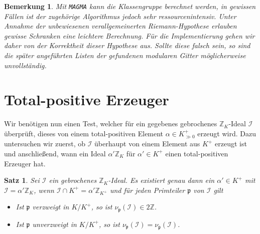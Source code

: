 \documentclass[12pt,a4paper,halfparskip,headsepline,bibtotocnumbered]{scrreprt}
\theoremstyle{nummermitklammern}
\newtheorem{satz}[defsatzusw]{Satz}
\newtheorem{bemerkung}[defsatzusw]{Bemerkung}
\theoremstyle{nonumberbreak}
\newcommand{\Z}{\mathbb{Z}}
\newcommand{\I}{\mathcal{I}}
\newcommand{\p}{\mathfrak{p}}
\begin{document}
\begin{bemerkung}
	Mit \texttt{MAGMA} kann die Klassengruppe berechnet werden, in gewissen Fällen ist der zugehörige Algorithmus jedoch sehr ressourcenintensiv. Unter Annahme der unbewiesenen \textit{verallgemeinerten Riemann-Hypothese} erlauben gewisse Schranken eine leichtere Berechnung. Für die Implementierung gehen wir daher von der Korrektheit dieser Hypothese aus. Sollte diese falsch sein, so sind die später angeführten Listen der gefundenen modularen Gitter möglicherweise unvollständig.
\end{bemerkung}

\section{Total-positive Erzeuger}

Wir benötigen nun einen Test, welcher für ein gegebenes gebrochenes $\Z_K$-Ideal $\I$ überprüft, dieses von einem total-positiven Element $\alpha \in K^+_{\gg 0}$ erzeugt wird. Dazu untersuchen wir zuerst, ob $\I$ überhaupt von einem Element aus $K^+$ erzeugt ist und anschließend, wann ein Ideal $\alpha'\Z_K$ für $\alpha' \in K^+$ einen total-positiven Erzeuger hat.

\begin{framed}
	\begin{satz}
		Sei $\I$ ein gebrochenes $\Z_K$-Ideal. Es existiert genau dann ein $\alpha' \in K^+$ mit $\I = \alpha' \Z_K$, wenn $\I \cap K^+ = \alpha' \Z_{K^+}$ und für jeden Primteiler $\p$ von $\I$ gilt
		\begin{itemize}
			\item Ist $\p$ verzweigt in $K / K^+$, so ist $\nu_\p(\I) \in 2\Z$.
			\item Ist $\p$ unverzweigt in $K / K^+$, so ist $\nu_\p(\I) = \nu_{\overline{\p}}(\I)$.
		\end{itemize}
	\end{satz}
\end{framed} 
\end{document}
